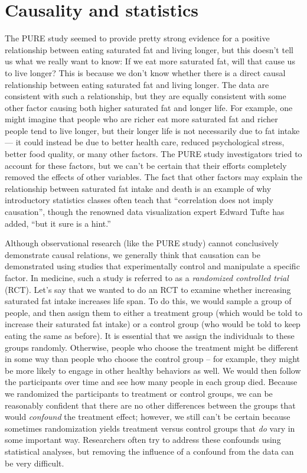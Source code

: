 \documentclass[
  12pt,
]{book}
\begin{document}
\hypertarget{causality-and-statistics}{%
\section{Causality and statistics}\label{causality-and-statistics}}

The PURE study seemed to provide pretty strong evidence for a positive relationship between eating saturated fat and living longer, but this doesn't tell us what we really want to know: If we eat more saturated fat, will that cause us to live longer? This is because we don't know whether there is a direct causal relationship between eating saturated fat and living longer. The data are consistent with such a relationship, but they are equally consistent with some other factor causing both higher saturated fat and longer life. For example, one might imagine that people who are richer eat more saturated fat and richer people tend to live longer, but their longer life is not necessarily due to fat intake --- it could instead be due to better health care, reduced psychological stress, better food quality, or many other factors. The PURE study investigators tried to account for these factors, but we can't be certain that their efforts completely removed the effects of other variables. The fact that other factors may explain the relationship between saturated fat intake and death is an example of why introductory statistics classes often teach that ``correlation does not imply causation'', though the renowned data visualization expert Edward Tufte has added, ``but it sure is a hint.''

Although observational research (like the PURE study) cannot conclusively demonstrate causal relations, we generally think that causation can be demonstrated using studies that experimentally control and manipulate a specific factor. In medicine, such a study is referred to as a \emph{randomized controlled trial} (RCT). Let's say that we wanted to do an RCT to examine whether increasing saturated fat intake increases life span. To do this, we would sample a group of people, and then assign them to either a treatment group (which would be told to increase their saturated fat intake) or a control group (who would be told to keep eating the same as before). It is essential that we assign the individuals to these groups randomly. Otherwise, people who choose the treatment might be different in some way than people who choose the control group -- for example, they might be more likely to engage in other healthy behaviors as well. We would then follow the participants over time and see how many people in each group died. Because we randomized the participants to treatment or control groups, we can be reasonably confident that there are no other differences between the groups that would \emph{confound} the treatment effect; however, we still can't be certain because sometimes randomization yields treatment versus control groups that \emph{do} vary in some important way. Researchers often try to address these confounds using statistical analyses, but removing the influence of a confound from the data can be very difficult.
\end{document}
